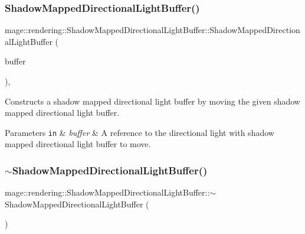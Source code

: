 \subsubsection{\texorpdfstring{Shadow\+Mapped\+Directional\+Light\+Buffer()}{ShadowMappedDirectionalLightBuffer()}\hspace{0.1cm}{\footnotesize\ttfamily [3/3]}}
{\footnotesize\ttfamily mage\+::rendering\+::\+Shadow\+Mapped\+Directional\+Light\+Buffer\+::\+Shadow\+Mapped\+Directional\+Light\+Buffer (\begin{DoxyParamCaption}\item[{\mbox{\hyperlink{structmage_1_1rendering_1_1_shadow_mapped_directional_light_buffer}{Shadow\+Mapped\+Directional\+Light\+Buffer}} \&\&}]{buffer }\end{DoxyParamCaption})\hspace{0.3cm}{\ttfamily [default]}, {\ttfamily [noexcept]}}

Constructs a shadow mapped directional light buffer by moving the given shadow mapped directional light buffer.


\begin{DoxyParams}[1]{Parameters}
\mbox{\tt in}  & {\em buffer} & A reference to the directional light with shadow mapped directional light buffer to move. \\
\hline
\end{DoxyParams}
\mbox{\label{structmage_1_1rendering_1_1_shadow_mapped_directional_light_buffer_a5566778f8ff3351b7e37240fe8a3dbf1}} 
\subsubsection{\texorpdfstring{$\sim$\+Shadow\+Mapped\+Directional\+Light\+Buffer()}{~ShadowMappedDirectionalLightBuffer()}}
{\footnotesize\ttfamily mage\+::rendering\+::\+Shadow\+Mapped\+Directional\+Light\+Buffer\+::$\sim$\+Shadow\+Mapped\+Directional\+Light\+Buffer (\begin{DoxyParamCaption}{ }\end{DoxyParamCaption})\hspace{0.3cm}{\ttfamily [default]}}

